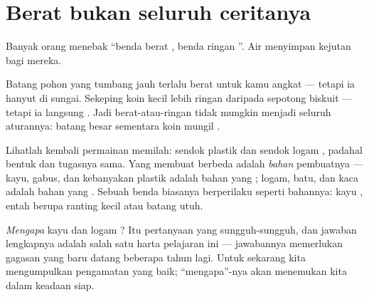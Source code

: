 \section{Berat bukan seluruh ceritanya}

Banyak orang menebak ``benda berat , benda ringan ''.
Air menyimpan kejutan bagi mereka.

\begin{example}\label{ex:g1:floating-and-sinking:log}
Batang pohon yang tumbang jauh terlalu berat untuk kamu angkat ---
tetapi ia hanyut  di sungai. Sekeping koin kecil lebih ringan
daripada sepotong biskuit --- tetapi ia langsung . Jadi
berat-atau-ringan tidak mungkin menjadi seluruh aturannya: batang
besar  sementara koin mungil .
\end{example}

\begin{example}\label{ex:g1:floating-and-sinking:stuff}
Lihatlah kembali permainan memilah: sendok plastik  dan sendok
logam , padahal bentuk dan tugasnya sama. Yang membuat
berbeda adalah \emph{bahan} pembuatnya --- kayu, gabus, dan kebanyakan
plastik adalah bahan yang ; logam, batu, dan kaca adalah bahan
yang . Sebuah benda biasanya berperilaku seperti bahannya:
kayu , entah berupa ranting kecil atau batang utuh.
\end{example}

\begin{remark}\label{rem:g1:floating-and-sinking:why}
\emph{Mengapa} kayu  dan logam ? Itu pertanyaan yang
sungguh-sungguh, dan jawaban lengkapnya adalah salah satu harta
pelajaran ini --- jawabannya memerlukan gagasan yang baru datang
beberapa tahun lagi. Untuk sekarang kita mengumpulkan pengamatan yang
baik; ``mengapa''-nya akan menemukan kita dalam keadaan siap.
\end{remark}

